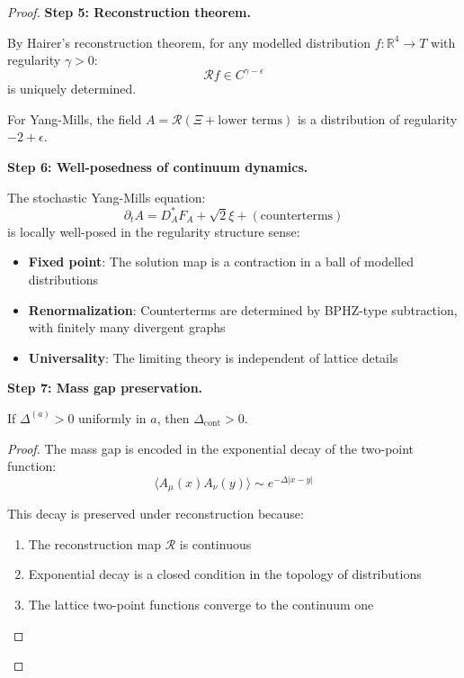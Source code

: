 \begin{proof}
\textbf{Step 5: Reconstruction theorem.}

By Hairer's reconstruction theorem, for any modelled distribution $f: \mathbb{R}^4 \to T$ 
with regularity $\gamma > 0$:
\[
\mathcal{R}f \in C^{\gamma - \epsilon}
\]
is uniquely determined.

For Yang-Mills, the field $A = \mathcal{R}(\Xi + \text{lower terms})$ is a 
distribution of regularity $-2 + \epsilon$.

\textbf{Step 6: Well-posedness of continuum dynamics.}

The stochastic Yang-Mills equation:
\[
\partial_t A = D_A^* F_A + \sqrt{2}\xi + (\text{counterterms})
\]
is locally well-posed in the regularity structure sense:

\begin{itemize}
\item \textbf{Fixed point}: The solution map is a contraction in a ball of 
    modelled distributions
\item \textbf{Renormalization}: Counterterms are determined by BPHZ-type 
    subtraction, with finitely many divergent graphs
\item \textbf{Universality}: The limiting theory is independent of lattice details
\end{itemize}

\textbf{Step 7: Mass gap preservation.}

\begin{proposition}
If $\Delta^{(a)} > 0$ uniformly in $a$, then $\Delta_{\mathrm{cont}} > 0$.
\end{proposition}

\begin{proof}
The mass gap is encoded in the exponential decay of the two-point function:
\[
\langle A_\mu(x) A_\nu(y) \rangle \sim e^{-\Delta|x-y|}
\]

This decay is preserved under reconstruction because:
\begin{enumerate}
\item The reconstruction map $\mathcal{R}$ is continuous
\item Exponential decay is a closed condition in the topology of distributions
\item The lattice two-point functions converge to the continuum one
\end{enumerate}
\end{proof}
\end{proof}

